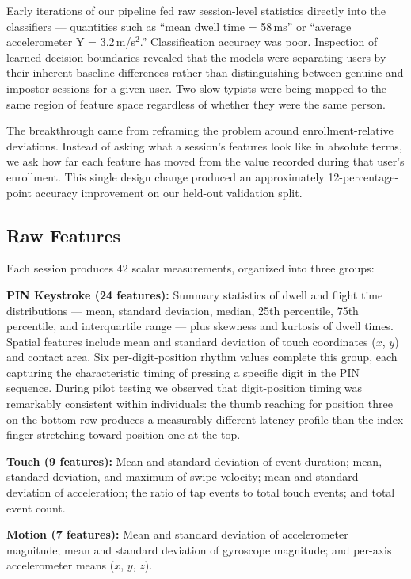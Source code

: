 \documentclass[conference]{IEEEtran}
\begin{document}
Early iterations of our pipeline fed raw session-level statistics directly into the classifiers --- quantities such as ``mean dwell time = 58\,ms'' or ``average accelerometer Y = 3.2\,m/s$^2$.'' Classification accuracy was poor. Inspection of learned decision boundaries revealed that the models were separating users by their inherent baseline differences rather than distinguishing between genuine and impostor sessions for a given user. Two slow typists were being mapped to the same region of feature space regardless of whether they were the same person.

The breakthrough came from reframing the problem around enrollment-relative deviations. Instead of asking what a session's features look like in absolute terms, we ask how far each feature has moved from the value recorded during that user's enrollment. This single design change produced an approximately 12-percentage-point accuracy improvement on our held-out validation split.

\subsection{Raw Features}

Each session produces 42 scalar measurements, organized into three groups:

\textbf{PIN Keystroke (24 features):} Summary statistics of dwell and flight time distributions --- mean, standard deviation, median, 25th percentile, 75th percentile, and interquartile range --- plus skewness and kurtosis of dwell times. Spatial features include mean and standard deviation of touch coordinates ($x$, $y$) and contact area. Six per-digit-position rhythm values complete this group, each capturing the characteristic timing of pressing a specific digit in the PIN sequence. During pilot testing we observed that digit-position timing was remarkably consistent within individuals: the thumb reaching for position three on the bottom row produces a measurably different latency profile than the index finger stretching toward position one at the top.

\textbf{Touch (9 features):} Mean and standard deviation of event duration; mean, standard deviation, and maximum of swipe velocity; mean and standard deviation of acceleration; the ratio of tap events to total touch events; and total event count.

\textbf{Motion (7 features):} Mean and standard deviation of accelerometer magnitude; mean and standard deviation of gyroscope magnitude; and per-axis accelerometer means ($x$, $y$, $z$).
\end{document}
